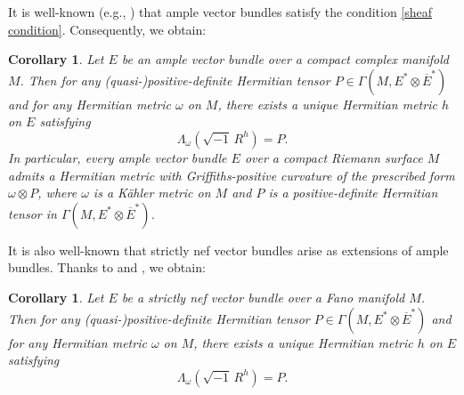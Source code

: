 \documentclass[12pt, reqno]{amsart}
\theoremstyle{plain}
\newtheorem{cor}[thm]{Corollary}
\theoremstyle{definition}
\newcommand{\bcorollary}{\begin{cor}}
\newcommand{\ecorollary}{\end{cor}}
\renewcommand{\bar}{\overline}
\newcommand{\ts}{\otimes}
\renewcommand{\>}{\rightarrow}
\renewcommand{\>}{\rightarrow}
\newcommand{\om}{\omega}
\renewcommand{\bar}{\overline}
\numberwithin{equation}{section} %
\begin{document}
\noindent 
It is well-known (e.g., \cite{Har66}) that ample vector bundles satisfy the condition \eqref{sheaf condition}. Consequently, we obtain:
\bcorollary\label{main3} Let $E$ be an ample vector bundle over a compact complex manifold $M$. Then   for any (quasi-)positive-definite Hermitian tensor $P\in \Gamma(M,E^*\ts \overline E^*)$ and for any Hermitian metric $\omega$ on $M$,  there exists a unique Hermitian metric  $h$ on $E$ satisfying
$$
\Lambda_{\om}\left(\sqrt{-1}\, R^{h}\right) = P.
$$
In particular, every ample vector bundle $E$ over a compact Riemann surface $M$ admits a  Hermitian metric with  Griffiths-positive curvature of the prescribed form $\omega\ts P$, where $\omega$ is a K\"ahler metric on $M$ and $P$ is a positive-definite Hermitian tensor in $\Gamma(M, E^*\ts \bar E^*)$.
\ecorollary


\noindent 
It is also well-known that strictly nef vector bundles arise as extensions of ample bundles. Thanks to \cite[Theorem~1.5]{LOY21} and \cite[Proposition~2.6]{LOY21}, we obtain:

\bcorollary\label{main6}  Let $E$ be a strictly nef vector bundle over a Fano manifold $M$. Then   for any (quasi-)positive-definite Hermitian tensor $P\in \Gamma(M,E^*\ts \overline E^*)$ and for any Hermitian metric $\omega$ on $M$,  there exists a unique Hermitian metric  $h$ on $E$ satisfying
$$
\Lambda_{\om}\left(\sqrt{-1}\, R^{h}\right) = P.
$$
\ecorollary
\end{document}
